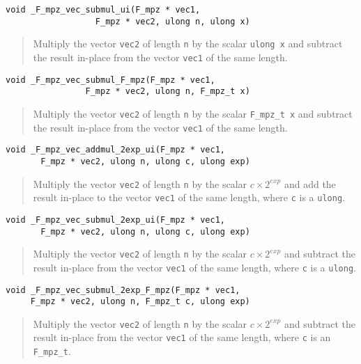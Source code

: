 \documentclass[a4paper,10pt]{article}
\newcommand{\code}{\lstinline}
\begin{document}
\begin{lstlisting}
void _F_mpz_vec_submul_ui(F_mpz * vec1, 
                  F_mpz * vec2, ulong n, ulong x)
\end{lstlisting}
\begin{quote}
Multiply the vector \code{vec2} of length \code{n} by the scalar \code{ulong x} and subtract the result
in-place from the vector \code{vec1} of the same length.
\end{quote}

\begin{lstlisting}
void _F_mpz_vec_submul_F_mpz(F_mpz * vec1, 
                F_mpz * vec2, ulong n, F_mpz_t x)
\end{lstlisting}
\begin{quote}
Multiply the vector \code{vec2} of length \code{n} by the scalar \code{F_mpz_t x} and subtract the result
in-place from the vector \code{vec1} of the same length.
\end{quote}

\begin{lstlisting}
void _F_mpz_vec_addmul_2exp_ui(F_mpz * vec1, 
       F_mpz * vec2, ulong n, ulong c, ulong exp)
\end{lstlisting}
\begin{quote}
Multiply the vector \code{vec2} of length \code{n} by the scalar $c \times 2^{exp}$ and add the result
in-place to the vector \code{vec1} of the same length, where \code{c} is a \code{ulong}.
\end{quote}

\begin{lstlisting}
void _F_mpz_vec_submul_2exp_ui(F_mpz * vec1, 
       F_mpz * vec2, ulong n, ulong c, ulong exp)
\end{lstlisting}
\begin{quote}
Multiply the vector \code{vec2} of length \code{n} by the scalar $c \times 2^{exp}$ and subtract the result
in-place from the vector \code{vec1} of the same length, where \code{c} is a \code{ulong}.
\end{quote}

\begin{lstlisting}
void _F_mpz_vec_submul_2exp_F_mpz(F_mpz * vec1, 
     F_mpz * vec2, ulong n, F_mpz_t c, ulong exp)
\end{lstlisting}
\begin{quote}
Multiply the vector \code{vec2} of length \code{n} by the scalar $c \times 2^{exp}$ and subtract the result
in-place from the vector \code{vec1} of the same length, where \code{c} is an \code{F_mpz_t}.
\end{quote}
\end{document}
